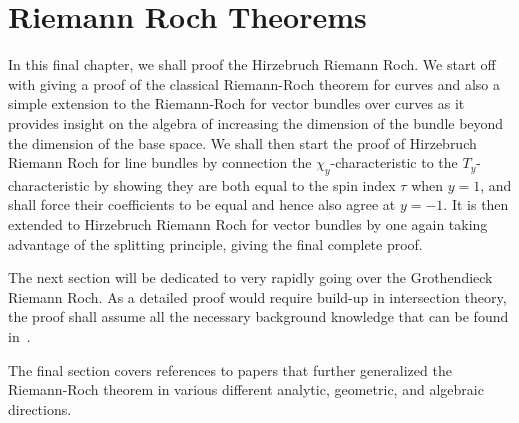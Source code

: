 \documentclass{book}
\begin{document}
%


\chapter{Riemann Roch Theorems}\label{cha:RR}


In this final chapter, we shall proof the Hirzebruch Riemann Roch. We start off with giving a proof of the
classical Riemann-Roch theorem for curves and also a simple extension to the Riemann-Roch for vector bundles
over curves as it provides insight on the algebra of increasing the dimension of the bundle beyond the
dimension of the base space. We shall then start the proof of Hirzebruch Riemann Roch for line bundles by connection the
$\chi_y$-characteristic to the $T_y$-characteristic by showing they are both equal to the spin index $\tau$
when $y =1$, and shall force their coefficients to be equal and hence also agree at $y=-1$. It is then extended to
Hirzebruch Riemann Roch for vector bundles by one again taking advantage of the splitting principle, giving
the final complete proof.

The next section will be dedicated to very rapidly going over the Grothendieck Riemann
Roch. As a detailed proof would require build-up in intersection theory, the proof shall assume all the
necessary background knowledge that can be found in~\cite{fultonIntersectionTheory1984}.


The final section covers references to papers that further generalized the Riemann-Roch theorem in various
different analytic, geometric, and algebraic directions.
\end{document}
